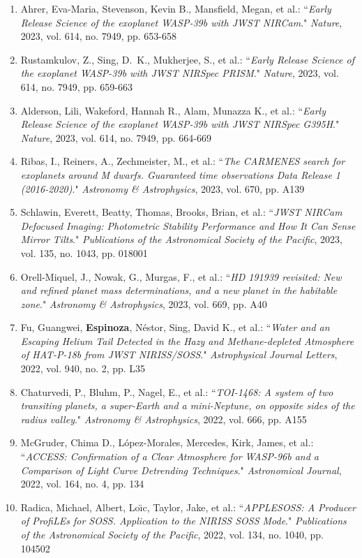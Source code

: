 \documentclass[12pt, a4paper]{article} %
\begin{document}
\begin{flushleft}
\begin{enumerate}
\item Ahrer, Eva-Maria, Stevenson, Kevin B., Mansfield, Megan, et al.: ``\textit{Early Release Science of the exoplanet WASP-39b with JWST NIRCam}." \textit{Nature}, 2023, vol. 614, no. 7949, pp. 653-658
\item Rustamkulov, Z., Sing, D.~K., Mukherjee, S., et al.: ``\textit{Early Release Science of the exoplanet WASP-39b with JWST NIRSpec PRISM}." \textit{Nature}, 2023, vol. 614, no. 7949, pp. 659-663
\item Alderson, Lili, Wakeford, Hannah R., Alam, Munazza K., et al.: ``\textit{Early Release Science of the exoplanet WASP-39b with JWST NIRSpec G395H}." \textit{Nature}, 2023, vol. 614, no. 7949, pp. 664-669
\item Ribas, I., Reiners, A., Zechmeister, M., et al.: ``\textit{The CARMENES search for exoplanets around M dwarfs. Guaranteed time observations Data Release 1 (2016-2020)}." \textit{Astronomy \& Astrophysics}, 2023, vol. 670, pp. A139
\item Schlawin, Everett, Beatty, Thomas, Brooks, Brian, et al.: ``\textit{JWST NIRCam Defocused Imaging: Photometric Stability Performance and How It Can Sense Mirror Tilts}." \textit{Publications of the Astronomical Society of the Pacific}, 2023, vol. 135, no. 1043, pp. 018001
\item Orell-Miquel, J., Nowak, G., Murgas, F., et al.: ``\textit{HD 191939 revisited: New and refined planet mass determinations, and a new planet in the habitable zone}." \textit{Astronomy \& Astrophysics}, 2023, vol. 669, pp. A40
\item Fu, Guangwei, \textbf{Espinoza}, Néstor, Sing, David K., et al.: ``\textit{Water and an Escaping Helium Tail Detected in the Hazy and Methane-depleted Atmosphere of HAT-P-18b from JWST NIRISS/SOSS}." \textit{Astrophysical Journal Letters}, 2022, vol. 940, no. 2, pp. L35
\item Chaturvedi, P., Bluhm, P., Nagel, E., et al.: ``\textit{TOI-1468: A system of two transiting planets, a super-Earth and a mini-Neptune, on opposite sides of the radius valley}." \textit{Astronomy \& Astrophysics}, 2022, vol. 666, pp. A155
\item McGruder, Chima D., López-Morales, Mercedes, Kirk, James, et al.: ``\textit{ACCESS: Confirmation of a Clear Atmosphere for WASP-96b and a Comparison of Light Curve Detrending Techniques}." \textit{Astronomical Journal}, 2022, vol. 164, no. 4, pp. 134
\item Radica, Michael, Albert, Loı̈c, Taylor, Jake, et al.: ``\textit{APPLESOSS: A Producer of ProfiLEs for SOSS. Application to the NIRISS SOSS Mode}." \textit{Publications of the Astronomical Society of the Pacific}, 2022, vol. 134, no. 1040, pp. 104502

\end{enumerate}
\end{flushleft}
\end{document}
